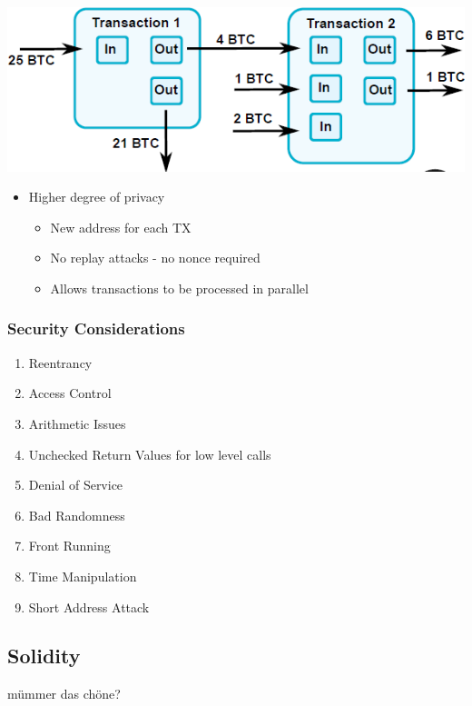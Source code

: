 \includegraphics[width=0.6\linewidth]{img/utxo_based.png}
\begin{itemize}
    \item Higher degree of privacy
    \begin{itemize}
        \item New address for each TX
        \item No replay attacks - no nonce required
        \item Allows transactions to be processed in parallel
    \end{itemize}
\end{itemize}

\subsubsection{Security Considerations}
\begin{enumerate}
    \item Reentrancy
    \item Access Control
    \item Arithmetic Issues
    \item Unchecked Return Values for low level calls
    \item Denial of Service
    \item Bad Randomness
    \item Front Running
    \item Time Manipulation
    \item Short Address Attack
\end{enumerate}

\subsection{Solidity}
mümmer das chöne?